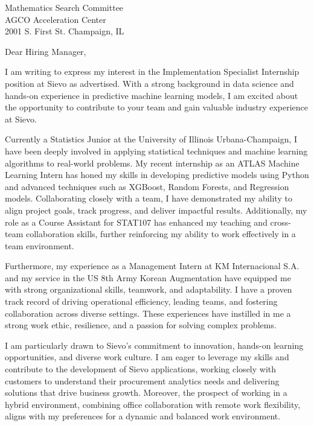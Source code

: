 \documentclass{letter}
\begin{document}
\begin{letter}{Mathematics Search Committee\\
AGCO Acceleration Center\\
2001 S. First St. Champaign, IL}


\opening{Dear Hiring Manager,}


I am writing to express my interest in the Implementation Specialist Internship position at Sievo as advertised. With a strong background in data science and hands-on experience in predictive machine learning models, I am excited about the opportunity to contribute to your team and gain valuable industry experience at Sievo.

Currently a Statistics Junior at the University of Illinois Urbana-Champaign, I have been deeply involved in applying statistical techniques and machine learning algorithms to real-world problems. My recent internship as an ATLAS Machine Learning Intern has honed my skills in developing predictive models using Python and advanced techniques such as XGBoost, Random Forests, and Regression models. Collaborating closely with a team, I have demonstrated my ability to align project goals, track progress, and deliver impactful results. Additionally, my role as a Course Assistant for STAT107 has enhanced my teaching and cross-team collaboration skills, further reinforcing my ability to work effectively in a team environment.

Furthermore, my experience as a Management Intern at KM Internacional S.A. and my service in the US 8th Army Korean Augmentation have equipped me with strong organizational skills, teamwork, and adaptability. I have a proven track record of driving operational efficiency, leading teams, and fostering collaboration across diverse settings. These experiences have instilled in me a strong work ethic, resilience, and a passion for solving complex problems.

I am particularly drawn to Sievo's commitment to innovation, hands-on learning opportunities, and diverse work culture. I am eager to leverage my skills and contribute to the development of Sievo applications, working closely with customers to understand their procurement analytics needs and delivering solutions that drive business growth. Moreover, the prospect of working in a hybrid environment, combining office collaboration with remote work flexibility, aligns with my preferences for a dynamic and balanced work environment.


\end{letter}
\end{document}
